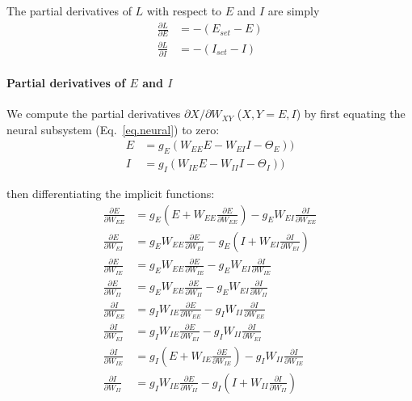 \documentclass[twocolumn]{article}
\newcommand{\EE}{\mathit{EE}}
\newcommand{\EI}{\mathit{EI}}
\newcommand{\IE}{\mathit{IE}}
\newcommand{\II}{\mathit{II}}
\newcommand{\XY}{\mathit{XY}}
\newcommand{\set}{\mathit{set}}
\begin{document}
The partial derivatives of $L$ with respect to $E$ and $I$ are simply
\begin{equation}
\begin{aligned}
\frac{\partial L}{\partial E} & = - (E_{\set} - E) \\
\frac{\partial L}{\partial I} & = - (I_{\set} - I)
\end{aligned}
\label{eq.LF_dLdEI}
\end{equation}



\paragraph{Partial derivatives of $E$ and $I$}

We compute the partial derivatives $\partial X/\partial W_{\XY}$ ($X,Y = E,I$) by first equating the neural subsystem (Eq.\ \ref{eq.neural}) to zero:
\begin{equation}
\begin{aligned}
E & = g_E(W_{\EE}E - W_{\EI}I - \Theta_E)) \\
I & = g_I(W_{\IE}E - W_{\II}I - \Theta_I))
\end{aligned}
\label{eq.LF_implicit_functions}
\end{equation}

\noindent then differentiating the implicit functions:
\begin{equation}
\begin{aligned}
\frac{\partial E}{\partial W_{\EE}} & = g_E(E + W_{\EE} \frac{\partial E}{\partial W_{\EE}}) - g_E W_{\EI} \frac{\partial I}{\partial W_{\EE}} \\
\frac{\partial E}{\partial W_{\EI}} & = g_E W_{\EE} \frac{\partial E}{\partial W_{\EI}} - g_E (I + W_{\EI} \frac{\partial I}{\partial W_{\EI}}) \\
\frac{\partial E}{\partial W_{\IE}} & = g_E W_{\EE} \frac{\partial E}{\partial W_{\IE}} - g_E W_{\EI}\frac{\partial I}{\partial W_{\IE}} \\
\frac{\partial E}{\partial W_{\II}} & = g_E W_{\EE} \frac{\partial E}{\partial W_{\II}} - g_E W_{\EI} \frac{\partial I}{\partial W_{\II}} \\
\frac{\partial I}{\partial W_{\EE}} & = g_I W_{\IE} \frac{\partial E}{\partial W_{\EE}} - g_I W_{\II} \frac{\partial I}{\partial W_{\EE}} \\
\frac{\partial I}{\partial W_{\EI}} & = g_I W_{\IE} \frac{\partial E}{\partial W_{\EI}} - g_I W_{\II} \frac{\partial I}{\partial W_{\EI}} \\
\frac{\partial I}{\partial W_{\IE}} & = g_I (E + W_{\IE} \frac{\partial E}{\partial W_{\IE}}) - g_I W_{\II} \frac{\partial I}{\partial W_{\IE}} \\
\frac{\partial I}{\partial W_{\II}} & = g_I W_{\IE} \frac{\partial E}{\partial W_{\II}} - g_I (I + W_{\II} \frac{\partial I}{\partial W_{\II}})
\end{aligned}
\label{eq.LF_implicit_derivs}
\end{equation}
\end{document}

